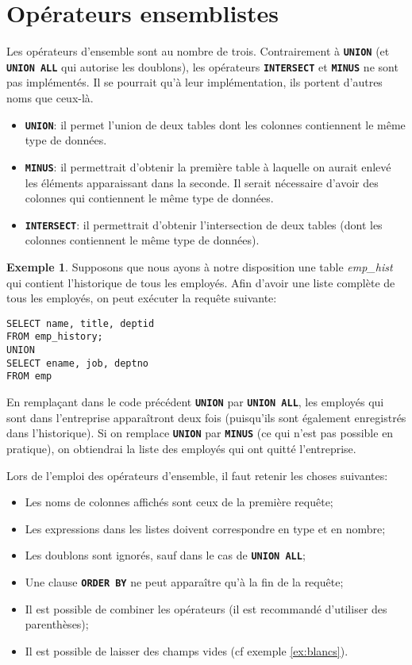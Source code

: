 \documentclass[a4paper, 12pt]{report}
\newcommand{\textSQL}[1]{\texttt{\textbf{#1}}}
\theoremstyle{definition} \newtheorem{ex}{Exemple}
\begin{document}
\section{Opérateurs ensemblistes}

Les opérateurs d'ensemble sont au nombre de trois. Contrairement à \textSQL{UNION} (et \textSQL{UNION ALL} qui autorise les doublons), les opérateurs \textSQL{INTERSECT} et \textSQL{MINUS} ne sont pas implémentés. Il se pourrait qu'à leur implémentation, ils portent d'autres noms que ceux-là.
\begin{itemize}
\item \textSQL{UNION}: il permet l'union de deux tables dont les colonnes contiennent le même type de données.
\item \textSQL{MINUS}: il permettrait d'obtenir la première table à laquelle on aurait enlevé les éléments apparaissant dans la seconde. Il serait nécessaire d'avoir des colonnes qui contiennent le même type de données.
\item \textSQL{INTERSECT}: il permettrait d'obtenir l'intersection de deux tables (dont les colonnes contiennent le même type de données).
\end{itemize}

\begin{ex}
Supposons que nous ayons à notre disposition une table \emph{emp\_hist} qui contient l'historique de tous les employés. Afin d'avoir une liste complète de tous les employés, on peut exécuter la requête suivante: 
\begin{lstlisting}[frame=single]
SELECT name, title, deptid
FROM emp_history;
UNION
SELECT ename, job, deptno
FROM emp
\end{lstlisting}
En remplaçant dans le code précédent \textSQL{UNION} par \textSQL{UNION ALL}, les employés qui sont dans l'entreprise apparaîtront deux fois (puisqu'ils sont également enregistrés dans l'historique). Si on remplace \textSQL{UNION} par \textSQL{MINUS} (ce qui n'est pas possible en pratique), on obtiendrai la liste des employés qui ont quitté l'entreprise.
\end{ex}

Lors de l'emploi des opérateurs d'ensemble, il faut retenir les choses suivantes:
\begin{itemize}
\item Les noms de colonnes affichés sont ceux de la première requête;
\item Les expressions dans les listes doivent correspondre en type et en nombre;
\item Les doublons sont ignorés, sauf dans le cas de \textSQL{UNION ALL};
\item Une clause \textSQL{ORDER BY} ne peut apparaître qu'à la fin de la requête;
\item Il est possible de combiner les opérateurs (il est recommandé d'utiliser des parenthèses);
\item Il est possible de laisser des champs vides (cf exemple \ref{ex:blancs}).
\end{itemize}
\end{document}

